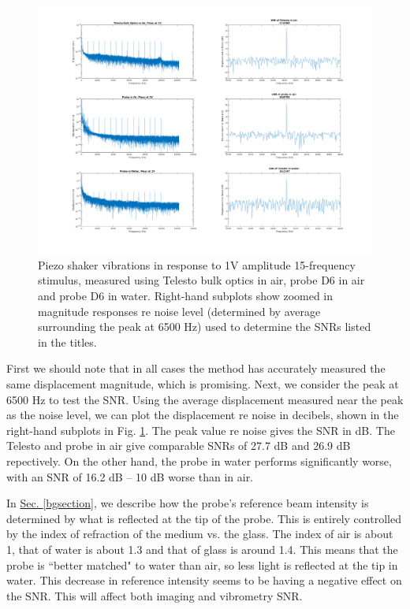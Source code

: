 \documentclass{article}
\begin{document}
\begin{figure}[!h]\label{airwater}
	\centering
	\includegraphics[width=\textwidth]{Data for Probe Writeup/SNRcomp.png}
	\caption{Piezo shaker vibrations in response to 1V amplitude 15-frequency stimulus, measured using Telesto bulk optics in air, probe D6 in air and probe D6 in water. Right-hand subplots show zoomed in magnitude responses re noise level (determined by average surrounding the peak at 6500 Hz) used to determine the SNRs listed in the titles.}
\end{figure}

\par{First we should note that in all cases the method has accurately measured the same displacement magnitude, which is promising. Next, we consider the peak at 6500 Hz to test the SNR. Using the average displacement measured near the peak as the noise level, we can plot the displacement re noise in decibels, shown in the right-hand subplots in Fig. \ref{airwater}. The peak value re noise gives the SNR in dB. The Telesto and probe in air give comparable SNRs of 27.7 dB and 26.9 dB repectively. On the other hand, the probe in water performs significantly worse, with an SNR of 16.2 dB -- 10 dB worse than in air.}

\par{In \hyperlink{bgsection}{Sec. \ref{bgsection}}, we describe how the probe's reference beam intensity is determined by what is reflected at the tip of the probe. This is entirely controlled by the index of refraction of the medium vs. the glass. The index of air is about 1, that of water is about 1.3 and that of glass is around 1.4. This means that the probe is ``better matched" to water than air, so less light is reflected at the tip in water. This decrease in reference intensity seems to be having a negative effect on the SNR. This will affect both imaging and vibrometry SNR.}
\end{document}
